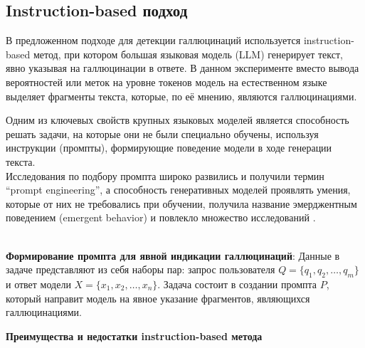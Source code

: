 \documentclass[12pt]{article}
\begin{document}
\subsection{Instruction-based подход}
В предложенном подходе для детекции галлюцинаций используется instruction-based метод, при котором большая языковая модель (LLM) генерирует текст, явно указывая на галлюцинации в ответе. В данном эксперименте вместо вывода вероятностей или меток на уровне токенов модель на естественном языке выделяет фрагменты текста, которые, по её мнению, являются галлюцинациями.

Одним из ключевых свойств крупных языковых моделей является способность решать задачи, на которые они не были специально обучены, используя инструкции (промпты), формирующие поведение модели в ходе генерации текста. \\
Исследования по подбору промпта широко развились \cite{reynolds2021promptprogramminglargelanguage, liu2021pretrainpromptpredictsystematic} и получили термин ``prompt engineering'', а способность генеративных моделей проявлять умения, которые от них не требовались при обучении, получила название эмерджентным поведением (emergent behavior) и повлекло множество исследований \cite{wei2022emergentabilitieslargelanguage, openai2024gpt4technicalreport}.

\\
\textbf{Формирование промпта для явной индикации галлюцинаций}:
   Данные в задаче представляют из себя наборы пар: запрос пользователя \( Q = \{q_1, q_2, \dots, q_m\} \) и ответ модели \( X = \{x_1, x_2, \dots, x_n\} \). Задача состоит в создании промпта \( P \), который направит модель на явное указание фрагментов, являющихся галлюцинациями.
   
\textbf{Преимущества и недостатки instruction-based метода}
\end{document}
